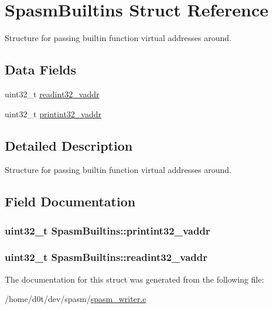 \hypertarget{struct_spasm_builtins}{\section{\-Spasm\-Builtins \-Struct \-Reference}
\label{struct_spasm_builtins}
}


\-Structure for passing builtin function virtual addresses around.  


\subsection*{\-Data \-Fields}
\begin{DoxyCompactItemize}
\item 
uint32\-\_\-t \hyperlink{struct_spasm_builtins_abe2b88179df728602a42a572bbbf68bb}{readint32\-\_\-vaddr}
\item 
uint32\-\_\-t \hyperlink{struct_spasm_builtins_aa5ea119e376ce7ab645eb1549e8c2533}{printint32\-\_\-vaddr}
\end{DoxyCompactItemize}


\subsection{\-Detailed \-Description}
\-Structure for passing builtin function virtual addresses around. 

\subsection{\-Field \-Documentation}
\hypertarget{struct_spasm_builtins_aa5ea119e376ce7ab645eb1549e8c2533}{
\subsubsection[{printint32\-\_\-vaddr}]{\setlength{\rightskip}{0pt plus 5cm}uint32\-\_\-t {\bf \-Spasm\-Builtins\-::printint32\-\_\-vaddr}}}\label{struct_spasm_builtins_aa5ea119e376ce7ab645eb1549e8c2533}
\hypertarget{struct_spasm_builtins_abe2b88179df728602a42a572bbbf68bb}{
\subsubsection[{readint32\-\_\-vaddr}]{\setlength{\rightskip}{0pt plus 5cm}uint32\-\_\-t {\bf \-Spasm\-Builtins\-::readint32\-\_\-vaddr}}}\label{struct_spasm_builtins_abe2b88179df728602a42a572bbbf68bb}


\-The documentation for this struct was generated from the following file\-:\begin{DoxyCompactItemize}
\item 
/home/d0t/dev/spasm/\hyperlink{spasm__writer_8c}{spasm\-\_\-writer.\-c}\end{DoxyCompactItemize}
